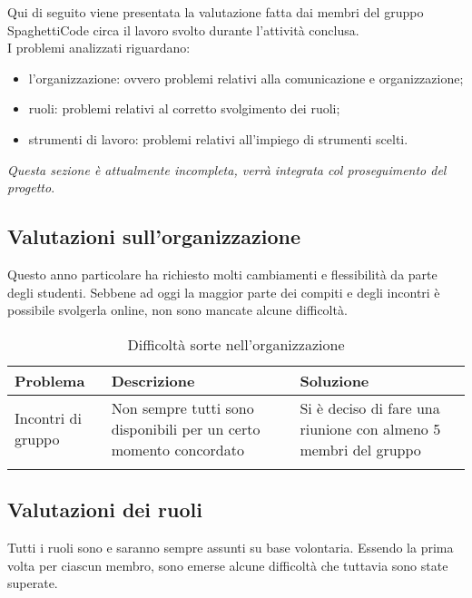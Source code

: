 \documentclass[../piano_di_qualifica.tex]{subfiles}
\begin{document}
Qui di seguito viene presentata la valutazione fatta dai membri del gruppo SpaghettiCode circa il lavoro svolto durante l'attività conclusa.\\
I problemi analizzati riguardano:
\begin{itemize}
	\item l'organizzazione: ovvero problemi relativi alla comunicazione e organizzazione;
	\item ruoli: problemi relativi al corretto svolgimento dei ruoli;
	\item strumenti di lavoro: problemi relativi all'impiego di strumenti scelti.
\end{itemize}
\emph{Questa sezione è attualmente incompleta, verrà integrata col proseguimento del progetto}.

\subsection{Valutazioni sull'organizzazione}
\label{sub:valut_org}
Questo anno particolare ha richiesto molti cambiamenti e flessibilità da parte degli studenti. Sebbene ad oggi la maggior parte dei compiti e
degli incontri è possibile svolgerla online, non sono mancate alcune difficoltà.

\begin{center}
	\begin{longtable}{|l|p{6cm}|p{6cm}|}
		\hline
		\rowcolor{lightgray}
		{\textbf{Problema}}                                               & {\textbf{Descrizione}} & {\textbf{Soluzione}} \\
		\hline
		Incontri di gruppo & Non sempre tutti sono disponibili per un certo momento concordato &
		Si è deciso di fare una riunione con almeno 5 membri del gruppo \\
		\hline
		\rowcolor{white}
		\caption{Difficoltà sorte nell'organizzazione}
	\end{longtable}
\end{center}

\subsection{Valutazioni dei ruoli}
\label{sub:valut_ruoli}
Tutti i ruoli sono e saranno sempre assunti su base volontaria. Essendo la prima volta per ciascun membro, sono emerse alcune difficoltà che tuttavia sono state superate.\par
\end{document}
